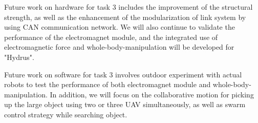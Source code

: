 \documentclass{standalone}
\begin{document}
Future work on hardware for task 3 includes the improvement of the structural strength, as well as the enhancement of the modularization of link system by using CAN communication network. We will also continue to validate the performance of the electromagnet module, and the integrated use of electromagnetic force and whole-body-manipulation will be developed for "Hydrus".

Future work on software for task 3 involves outdoor experiment with actual robots to test the performance of both electromagnet module and whole-body-manipulation. In addition, we will focus on the collaborative motion for picking up the large object using two or three UAV simultaneously, as well as swarm control strategy while searching object.
\end{document}
